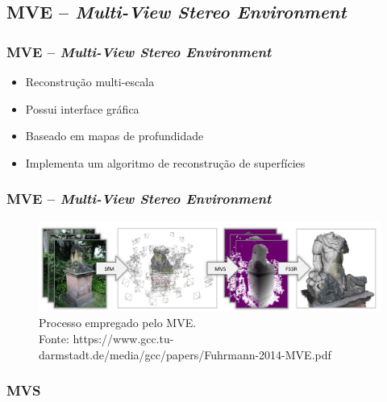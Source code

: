 \documentclass[table, usenames, svgnames, xcolor=dvipsnames]{beamer}
\begin{document}
\subsection{MVE -- \emph{Multi-View Stereo Environment}}

\begin{frame} 
\frametitle{\textbf{MVE -- \emph{Multi-View Stereo Environment}}}
	\begin{center}
		\begin{itemize}
		\item {Reconstrução multi-escala}
		\item {Possui interface gráfica}
		\item {Baseado em mapas de profundidade}
		\item {Implementa um algoritmo de reconstrução de superfícies}
		\end{itemize}
	\end{center}
\end{frame}

\begin{frame}
\frametitle{\textbf{MVE -- \emph{Multi-View Stereo Environment}}}
	\begin{center}
	\begin{figure}
		\centering
		\includegraphics[width=1\linewidth]{figs/mvepipe.png}
	 	\caption{
		Processo empregado pelo MVE. \\
		\tiny{Fonte: https://www.gcc.tu-darmstadt.de/media/gcc/papers/Fuhrmann-2014-MVE.pdf}
	}
	\end{figure}
	\end{center}
\end{frame}

\subsubsection{MVS}
\end{document}
